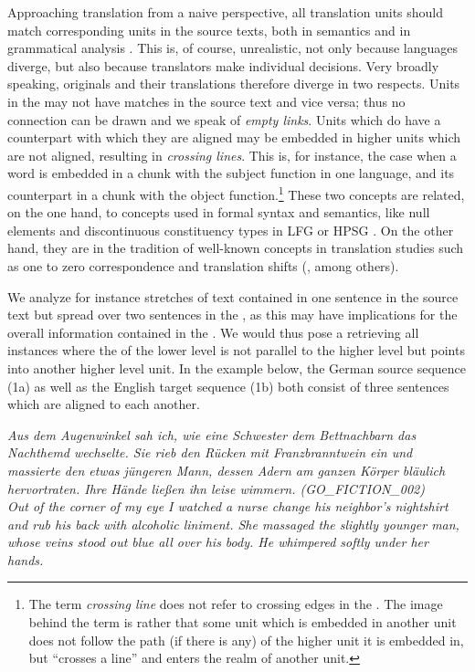 \documentclass[output=paper]{LSP/langsci}
\begin{document}
Approaching translation from a naive perspective, all translation units should match corresponding units in the source texts, both in semantics and in grammatical analysis \citep{Padó2007}. This is, of course, unrealistic, not only because languages diverge, but also because translators make individual decisions. Very broadly speaking, originals and their translations therefore diverge in two respects. Units in the  may not have matches in the source text and vice versa; thus no connection can be drawn and we speak of \textit{empty links}. Units which do have a counterpart with which they are aligned may be embedded in higher units which are not aligned, resulting in \textit{crossing lines}. This is, for instance, the case when a word is embedded in a chunk with the subject function in one language, and its counterpart in a chunk with the object function.\footnote{The term \textit{crossing line} does not refer to crossing edges in the . The image behind the term is rather that some unit which is embedded in another unit does not follow the  path (if there is any) of the higher unit it is embedded in, but ``crosses a line'' and enters the realm of another unit.} These two concepts are related, on the one hand, to concepts used in formal syntax and semantics, like null elements and discontinuous constituency types in LFG \citep{Bresnan1982} or HPSG \citep{Pollard1994}. On the other hand, they are in the tradition of well-known concepts in translation studies such as one to zero correspondence and translation shifts (\citealt{Koller2001,Vinay1958,Catford1965,Newmark1988,Leuven-Zwart1989,Cyrus2006}, among others).


We analyze for instance stretches of text contained in one sentence in the source text but spread over two sentences in the , as this may have implications for the overall information contained in the . We would thus pose a  retrieving all instances where the  of the lower level is not parallel to the higher level  but points into another higher level unit. In the example below, the German source sequence (1a) as well as the English target sequence (1b) both consist of three sentences which are aligned to each another.

\ea\label{ex:culo:1}
    \ea \textit{Aus dem Augenwinkel sah ich, wie eine Schwester dem Bettnachbarn das Nachthemd   wechselte. Sie rieb den Rücken mit Franzbranntwein ein und massierte den etwas   jüngeren Mann, dessen Adern am ganzen Körper bläulich hervortraten. Ihre Hände   ließen ihn leise wimmern. \textup{(GO\_FICTION\_002)}}\\
    \ex \textit{Out of the corner of my eye I watched a nurse change his neighbor's nightshirt and rub   his back with alcoholic liniment. She massaged the slightly younger man, whose veins   stood out blue all over his body. He whimpered softly under her hands.}
    \z
\z
\end{document}
